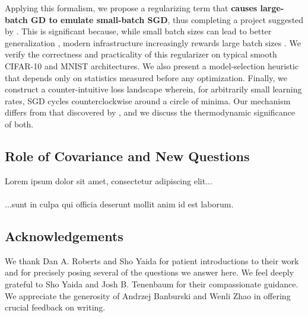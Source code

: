 \documentclass{article}
\newcommand{\sdia}[1]{\begin{gathered}\texttt{[image: ../diagrams/\#1.png]}\end{gathered}}
\newcommand{\lorem}[1]{
    Lorem ipsum dolor sit amet, consectetur adipiscing elit...\\
    \nopagebreak\vspace{#1cm} \ \\
    ...sunt in culpa qui officia deserunt mollit anim id est laborum.
}
\begin{document}

    Applying this formalism, we propose a regularizing term that {\bf causes
    large-batch GD to emulate small-batch SGD}, thus completing a project
    suggested by \citet{ro18}.  This is significant because, while small batch
    sizes can lead to better generalization \citep{bo91}, modern infrastructure
    increasingly rewards large batch sizes \citep{go18}.  We verify the
    correctness and practicality of this regularizer on typical smooth CIFAR-10
    and MNIST architectures.  We also present a model-selection heuristic that
    depends only on statistics measured before any optimization.  Finally,
    we construct a counter-intuitive loss landscape wherein, for arbitrarily
    small learning rates, SGD cycles counterclockwise around a circle of
    minima.  Our mechanism differs from that discovered by \citet{ch18}, and we
    discuss the thermodynamic significance of both.
\subsection*{Role of Covariance and New Questions}
    \lorem{5}


\subsection*{Acknowledgements}
    We thank Dan A. Roberts and Sho Yaida for patient introductions to their
    work and for precisely posing several of the questions we answer here.  We
    feel deeply grateful to Sho Yaida and Josh B. Tenenbaum for their
    compassionate guidance.  We appreciate the generosity of
        Andrzej Banburski
        and
        Wenli Zhao
    in offering crucial feedback on writing.
\end{document}
